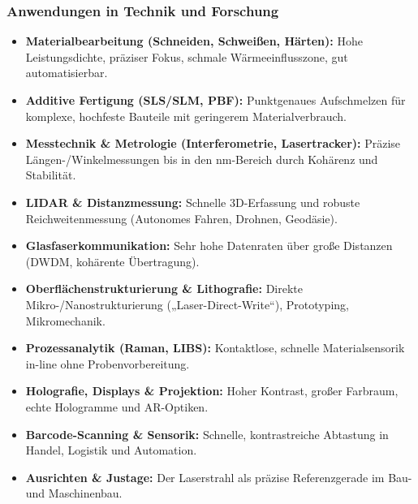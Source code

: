 \subsubsection{Anwendungen in Technik und Forschung}

\begin{tcolorbox}[didaktikbox, title={Anwendungen von Lasern — Technik (Überblick)}]	
	\label{box:lasertechnik}
	\begin{itemize}
		\item \textbf{Materialbearbeitung (Schneiden, Schweißen, Härten):} Hohe Leistungsdichte, präziser Fokus, schmale Wärmeeinflusszone, gut automatisierbar.
		\item \textbf{Additive Fertigung (SLS/SLM, PBF):} Punktgenaues Aufschmelzen für komplexe, hochfeste Bauteile mit geringerem Materialverbrauch.
		\item \textbf{Messtechnik \& Metrologie (Interferometrie, Lasertracker):} Präzise Längen-/Winkelmessungen bis in den nm-Bereich durch Kohärenz und Stabilität.
		\item \textbf{LIDAR \& Distanzmessung:} Schnelle 3D-Erfassung und robuste Reichweitenmessung (Autonomes Fahren, Drohnen, Geodäsie).
		\item \textbf{Glasfaserkommunikation:} Sehr hohe Datenraten über große Distanzen (DWDM, kohärente Übertragung).
		\item \textbf{Oberflächenstrukturierung \& Lithografie:} Direkte Mikro-/Nanostrukturierung („Laser-Direct-Write“), Prototyping, Mikromechanik.
		\item \textbf{Prozessanalytik (Raman, LIBS):} Kontaktlose, schnelle Materialsensorik in-line ohne Probenvorbereitung.
		\item \textbf{Holografie, Displays \& Projektion:} Hoher Kontrast, großer Farbraum, echte Hologramme und AR-Optiken.
		\item \textbf{Barcode-Scanning \& Sensorik:} Schnelle, kontrastreiche Abtastung in Handel, Logistik und Automation.
		\item \textbf{Ausrichten \& Justage:} Der Laserstrahl als präzise Referenzgerade im Bau- und Maschinenbau.
	\end{itemize}
\end{tcolorbox}

